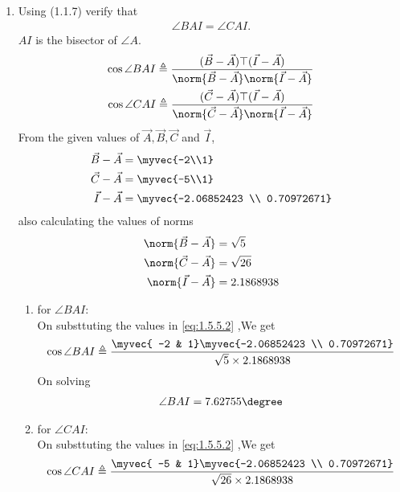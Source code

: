 \documentclass[11pt]{book}
\begin{document}
\begin{enumerate}[label=\thesection.\arabic*.,ref=\thesection.\theenumi]
\item Using (1.1.7) verify that 
\begin{align}
\angle BAI = \angle CAI.
\end{align}
$AI$ is the bisector of $\angle A$. \\
\solution
\begin{align}
\label{eq:1.5.5.2}
\cos{\angle BAI} \triangleq \frac{(\vec{B}-\vec{A})\top(\vec{I}-\vec{A})}{\norm{\vec{B}-\vec{A}}\norm{\vec{I}-\vec{A}}} \\
\cos{\angle CAI} \triangleq \frac{(\vec{C}-\vec{A})\top(\vec{I}-\vec{A})}{\norm{\vec{C}-\vec{A}}\norm{\vec{I}-\vec{A}}} 
\end{align}
From the given values of $\vec{A},\vec{B},\vec{C}$ and $\vec{I}$,
\begin{align}
	\vec{B}-\vec{A} &=\myvec{-2\\1} \\
	\vec{C}-\vec{A}&= \myvec{-5\\1} \\
 \vec{I}-\vec{A}  &=\myvec{-2.06852423 \\ 0.70972671}
\end{align}
also calculating the values of norms
\begin{align}
	\norm{\vec{B}-\vec{A}} &= \sqrt{5} \\
	\norm{\vec{C}-\vec{A}} &= \sqrt{26} \\
 	\norm{\vec{I}-\vec{A}} &= 2.1868938 \\
\end{align}
\begin{enumerate}
    \item for $\angle BAI$: \\
    On substtuting the values in  \eqref{eq:1.5.5.2} ,We get 
    \begin{align}
	    \cos{\angle BAI} \triangleq \frac{\myvec{ -2 & 1}\myvec{-2.06852423 \\ 0.70972671}}{ \sqrt{5}\times 2.1868938} \\
    \end{align}
    On solving 
    \begin{align}
        \angle BAI = 7.62755\degree
    \end{align}
       \item for $\angle CAI$: \\
    On substtuting the values in  \eqref{eq:1.5.5.2} ,We get 
    \begin{align}
        \cos{\angle CAI} \triangleq \frac{\myvec{ -5 & 1}\myvec{-2.06852423 \\ 0.70972671}}{\sqrt{26}\times 2.1868938} \\

\end{align}
\end{enumerate}
\end{enumerate}
\end{document}
